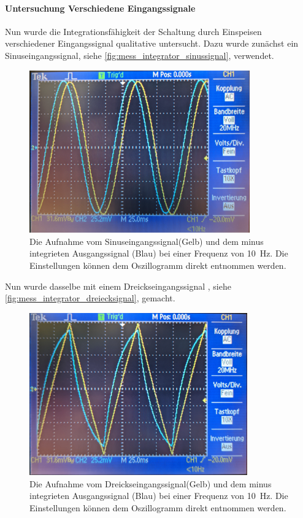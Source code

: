 \documentclass[12pt,english,ngerman]{scrartcl}
\begin{document}
\paragraph{Untersuchung Verschiedene Eingangssignale}
Nun wurde die Integrationsfähigkeit der Schaltung durch Einspeisen
verschiedener Eingangssignal qualitative untersucht. Dazu wurde zunächst ein
Sinuseingangssignal, siehe \autoref{fig:mess_integrator_sinussignal}, verwendet.
 
\begin{figure}[H]
  \centering
    \includegraphics[width=\linewidth, height=7cm]{./figures/integrator/sinussignal.jpg}
  \caption{Die Aufnahme vom Sinuseingangssignal(Gelb) und dem minus integrieten
  Ausgangssignal (Blau) bei einer Frequenz von \SI{10}{\hertz}. Die
  Einstellungen können dem Oszillogramm direkt entnommen werden.}
  \label{fig:mess_integrator_sinussignal}
\end{figure}

Nun wurde dasselbe mit einem Dreickseingangssignal
, siehe \autoref{fig:mess_integrator_dreiecksignal}, gemacht.

\begin{figure}[H]
  \centering
    \includegraphics[width=\linewidth, height=7cm]{./figures/integrator/dreiecksignal.jpg}
  \caption{Die Aufnahme vom Dreickseingangssignal(Gelb) und dem minus integrieten
  Ausgangssignal (Blau) bei einer Frequenz von \SI{10}{\hertz}. Die
  Einstellungen können dem Oszillogramm direkt entnommen werden.}
  \label{fig:mess_integrator_dreiecksignal}
\end{figure}
\end{document}

